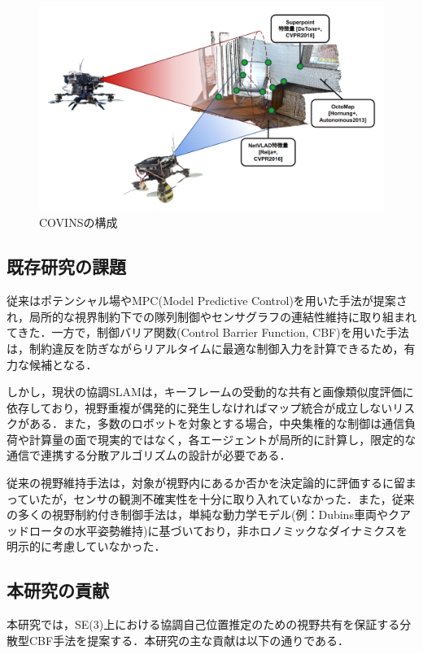 \begin{figure}[htbp]
\centering
\includegraphics[width=0.8\linewidth]{fig/covins.png}
\caption{COVINSの構成}
\label{fig:covins}
\end{figure}
\subsection{既存研究の課題}

従来はポテンシャル場やMPC(Model Predictive Control)を用いた手法が提案され，局所的な視界制約下での隊列制御やセンサグラフの連結性維持に取り組まれてきた\cite{Sabattini2013}．一方で，制御バリア関数(Control Barrier Function, CBF)を用いた手法は，制約違反を防ぎながらリアルタイムに最適な制御入力を計算できるため，有力な候補となる\cite{Capelli2020}．

しかし，現状の協調SLAMは，キーフレームの受動的な共有と画像類似度評価に依存しており，視野重複が偶発的に発生しなければマップ統合が成立しないリスクがある．また，多数のロボットを対象とする場合，中央集権的な制御は通信負荷や計算量の面で現実的ではなく，各エージェントが局所的に計算し，限定的な通信で連携する分散アルゴリズムの設計が必要である．

従来の視野維持手法は，対象が視野内にあるか否かを決定論的に評価するに留まっていたが，センサの観測不確実性を十分に取り入れていなかった\cite{Panagou2012}．また，従来の多くの視野制約付き制御手法は，単純な動力学モデル(例：Dubins車両やクアッドロータの水平姿勢維持)に基づいており，非ホロノミックなダイナミクスを明示的に考慮していなかった\cite{Dias2016}．

\subsection{本研究の貢献}

本研究では，SE(3)上における協調自己位置推定のための視野共有を保証する分散型CBF手法を提案する．本研究の主な貢献は以下の通りである．


